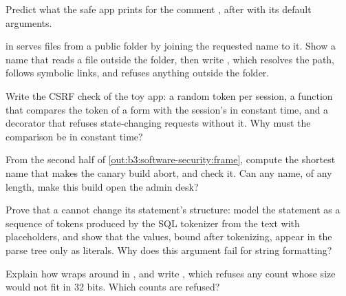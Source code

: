 \begin{exercise}[$\star$]\label{exo:b3:software-security:4}
Predict what the safe app prints for the comment , after  with its default arguments.
\end{exercise}

\begin{exercise}[$\star\star$]\label{exo:b3:software-security:5}
 in  serves files from a public folder by joining the requested name to it. Show a name that reads a file outside the folder, then write , which resolves the path, follows symbolic links, and refuses anything outside the folder.
\end{exercise}

\begin{exercise}[$\star\star$]\label{exo:b3:software-security:6}
Write the CSRF check of the toy app: a random token per session, a function that compares the token of a form with the session's in constant time, and a decorator  that refuses state-changing requests without it. Why must the comparison be in constant time?
\end{exercise}

\begin{exercise}[$\star\star$]\label{exo:b3:software-security:7}
From the second half of \cref{out:b3:software-security:frame}, compute the shortest name that makes the canary build abort, and check it. Can any name, of any length, make this build open the admin desk?
\end{exercise}

\begin{exercise}[$\star\star$]\label{exo:b3:software-security:8}
Prove that a  cannot change its statement's structure: model the statement as a sequence of tokens produced by the SQL tokenizer from the text with placeholders, and show that the values, bound after tokenizing, appear in the parse tree only as literals. Why does this argument fail for string formatting?
\end{exercise}

\begin{exercise}[$\star\star$]\label{exo:b3:software-security:9}
Explain how  wraps around in , and write , which refuses any count whose size would not fit in 32 bits. Which counts are refused?
\end{exercise}

